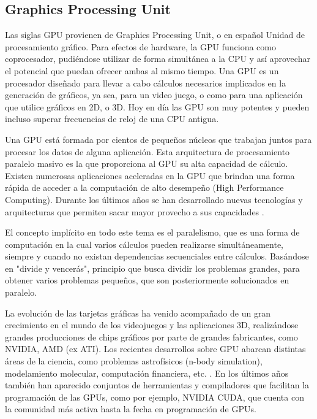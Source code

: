 \subsection{Graphics Processing Unit}
Las siglas GPU provienen de Graphics Processing Unit, o en español Unidad de procesamiento gráfico. Para efectos de hardware, la GPU funciona como coprocesador,
pudiéndose utilizar de forma simultánea a la CPU y así aprovechar el potencial que puedan ofrecer ambas al mismo tiempo. Una GPU es un procesador
diseñado para llevar a cabo cálculos necesarios implicados en la generación de gráficos, ya sea, para un video juego, o como para una aplicación que utilice
gráficos en 2D, o 3D. Hoy en día las GPU son muy potentes y pueden incluso superar frecuencias de reloj de una CPU antigua.

Una GPU está formada por cientos de pequeños núcleos que trabajan juntos para procesar los datos de alguna aplicación. Esta arquitectura de procesamiento paralelo
masivo es la que proporciona al GPU su alta capacidad de cálculo. Existen numerosas aplicaciones aceleradas en la GPU que brindan una forma rápida de acceder
a la computación de alto desempeño (High Performance Computing). Durante los últimos años se han desarrollado nuevas tecnologías y arquitecturas
que permiten sacar mayor provecho a sus capacidades \cite{owens2007gpu}.

El concepto implícito en todo este tema es el paralelismo, que es una forma de computación en la cual varios cálculos pueden realizarse simultáneamente,
siempre y cuando no existan dependencias secuenciales entre cálculos. Basándose en "divide y vencerás", principio que busca dividir los problemas grandes, para
obtener varios problemas pequeños, que son posteriormente solucionados en paralelo.

La evolución de las tarjetas gráficas ha venido acompañado de un gran crecimiento en el mundo de los videojuegos y las aplicaciones 3D, realizándose grandes
producciones de chips gráficos por parte de grandes fabricantes, como NVIDIA, AMD (ex ATI). Los recientes desarrollos sobre GPU abarcan distintas áreas de la ciencia,
como problemas astrofísicos (n-body simulation), modelamiento molecular, computación financiera, etc. \cite{kirk2010programming}. En los últimos años también han aparecido 
conjuntos de herramientas y compiladores que facilitan la programación de las GPUs, como por ejemplo, NVIDIA CUDA, que cuenta con la comunidad más activa hasta 
la fecha en programación de GPUs.

